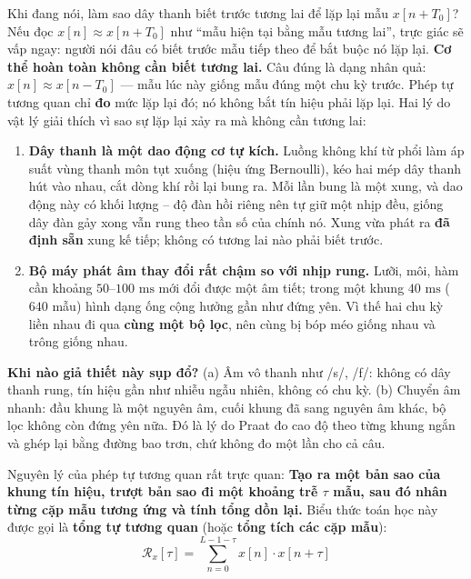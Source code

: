 \documentclass[11pt,a4paper]{article}
\begin{document}
\begin{thoughtqa}{Khi đang nói, làm sao dây thanh biết trước tương lai để lặp lại mẫu $x[n + T_0]$?}
Nếu đọc $x[n] \approx x[n + T_0]$ như ``mẫu hiện tại bằng mẫu tương lai'', trực giác sẽ vấp ngay: người nói đâu có biết trước mẫu tiếp theo để bắt buộc nó lặp lại. \textbf{Cơ thể hoàn toàn không cần biết tương lai.} Câu đúng là dạng nhân quả: \textbf{$x[n] \approx x[n - T_0]$} --- mẫu lúc này giống mẫu đúng một chu kỳ trước. Phép tự tương quan chỉ \textbf{đo} mức lặp lại đó; nó không bắt tín hiệu phải lặp lại. Hai lý do vật lý giải thích vì sao sự lặp lại xảy ra mà không cần tương lai:

\begin{enumerate}
    \setlength{\itemsep}{0.5pt}
    \item \textbf{Dây thanh là một dao động cơ tự kích.} Luồng không khí từ phổi làm áp suất vùng thanh môn tụt xuống (hiệu ứng Bernoulli), kéo hai mép dây thanh hút vào nhau, cắt dòng khí rồi lại bung ra. Mỗi lần bung là một xung, và dao động này có khối lượng -- độ đàn hồi riêng nên tự giữ một nhịp đều, giống dây đàn gảy xong vẫn rung theo tần số của chính nó. Xung vừa phát ra \textbf{đã định sẵn} xung kế tiếp; không có tương lai nào phải biết trước.
    \item \textbf{Bộ máy phát âm thay đổi rất chậm so với nhịp rung.} Lưỡi, môi, hàm cần khoảng $50\text{--}100\text{ ms}$ mới đổi được một âm tiết; trong một khung $40\text{ ms}$ ($640$ mẫu) hình dạng ống cộng hưởng gần như đứng yên. Vì thế hai chu kỳ liền nhau đi qua \textbf{cùng một bộ lọc}, nên cùng bị bóp méo giống nhau và trông giống nhau.
\end{enumerate}

\textbf{Khi nào giả thiết này sụp đổ?} (a) Âm vô thanh như /s/, /f/: không có dây thanh rung, tín hiệu gần như nhiễu ngẫu nhiên, không có chu kỳ. (b) Chuyển âm nhanh: đầu khung là một nguyên âm, cuối khung đã sang nguyên âm khác, bộ lọc không còn đứng yên nữa. Đó là lý do Praat đo cao độ theo từng khung ngắn và ghép lại bằng đường bao trơn, chứ không đo một lần cho cả câu.
\end{thoughtqa}

Nguyên lý của phép tự tương quan rất trực quan: \textbf{Tạo ra một bản sao của khung tín hiệu, trượt bản sao đi một khoảng trễ $\tau$ mẫu, sau đó nhân từng cặp mẫu tương ứng và tính tổng dồn lại.} Biểu thức toán học này được gọi là \textbf{tổng tự tương quan} (hoặc \textbf{tổng tích các cặp mẫu}):
\begin{equation}
\mathcal{R}_x[\tau] = \sum_{n=0}^{L - 1 - \tau} x[n] \cdot x[n + \tau]
\label{eq:raw_autocorr}
\end{equation}
\end{document}
